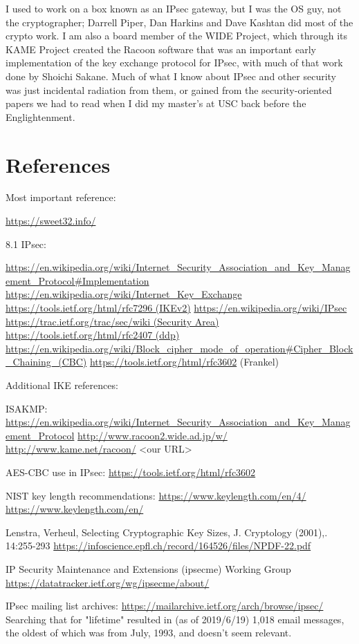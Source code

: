 \documentclass[%
 aip,
 jmp,%
 amsmath,amssymb,
 reprint,%
]{revtex4-1}
\begin{document}
I used to work on a box known as an IPsec gateway, but I was the OS
guy, not the cryptographer; Darrell Piper, Dan Harkins and Dave
Kashtan did most of the crypto work.  I am also a board member of the
WIDE Project, which through its KAME Project created the Racoon
software that was an important early implementation of the key
exchange protocol for IPsec, with much of that work done by Shoichi
Sakane.  Much of what I know about IPsec and other security was just
incidental radiation from them, or gained from the security-oriented
papers we had to read when I did my master's at USC back before the
Englightenment.

\section{References}



Most important reference:

\url{https://sweet32.info/}

8.1 IPsec:

\url{https://en.wikipedia.org/wiki/Internet_Security_Association_and_Key_Management_Protocol#Implementation}
\url{https://en.wikipedia.org/wiki/Internet_Key_Exchange}
\url{https://tools.ietf.org/html/rfc7296 (IKEv2)}
\url{https://en.wikipedia.org/wiki/IPsec}
\url{https://trac.ietf.org/trac/sec/wiki (Security Area)}
\url{https://tools.ietf.org/html/rfc2407 (ddp)}
\url{https://en.wikipedia.org/wiki/Block_cipher_mode_of_operation#Cipher_Block_Chaining_(CBC)}
\url{https://tools.ietf.org/html/rfc3602} (Frankel)

Additional IKE references:

ISAKMP:
\url{https://en.wikipedia.org/wiki/Internet_Security_Association_and_Key_Management_Protocol}
\url{http://www.racoon2.wide.ad.jp/w/}
\url{http://www.kame.net/racoon/}
<our URL>

AES-CBC use in IPsec:
\url{https://tools.ietf.org/html/rfc3602}

NIST key length recommendations:
\url{https://www.keylength.com/en/4/}
\url{https://www.keylength.com/en/}

Lenstra, Verheul, Selecting Cryptographic Key Sizes, J. Cryptology
(2001),. 14:255-293
\url{https://infoscience.epfl.ch/record/164526/files/NPDF-22.pdf}

IP Security Maintenance and Extensions (ipsecme) Working Group
\url{https://datatracker.ietf.org/wg/ipsecme/about/}

IPsec mailing list archives:
\url{https://mailarchive.ietf.org/arch/browse/ipsec/}
Searching that for "lifetime" resulted in (as of 2019/6/19) 1,018
email messages, the oldest of which was from July, 1993, and doesn't
seem relevant.
\end{document}
